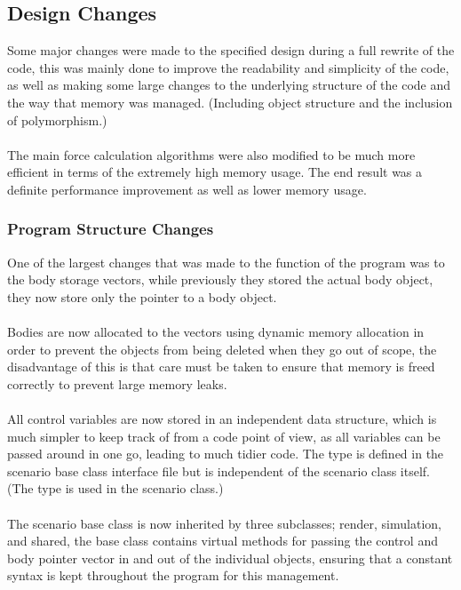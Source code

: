 {
\subsection{Design Changes}
Some major changes were made to the specified design during a full rewrite of the code, this was mainly done to improve the readability and simplicity of the code, as well as making some large changes to the underlying structure of the code and the way that memory was managed. (Including object structure and the inclusion of polymorphism.)

\paragraph{}
The main force calculation algorithms were also modified to be much more efficient in terms of the extremely high memory usage. The end result was a definite performance improvement as well as lower memory usage.

\subsubsection{Program Structure Changes}
One of the largest changes that was made to the function of the program was to the body storage vectors, while previously they stored the actual body object, they now store only the pointer to a body object.

\paragraph{}
Bodies are now allocated to the vectors using dynamic memory allocation in order to prevent the objects from being deleted when they go out of scope, the disadvantage of this is that care must be taken to ensure that memory is freed correctly to prevent large memory leaks.

\paragraph{}
All control variables are now stored in an independent data structure, which is much simpler to keep track of from a code point of view, as all variables can be passed around in one go, leading to much tidier code. The type is defined in the scenario base class interface file but is independent of the scenario class itself. (The type is used in the scenario class.)

\paragraph{}
The scenario base class is now inherited by three subclasses; render, simulation, and shared, the base class contains virtual methods for passing the control and body pointer vector in and out of the individual objects, ensuring that a constant syntax is kept throughout the program for this management.

}
